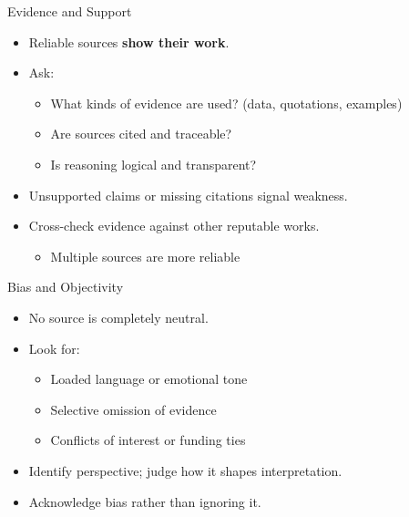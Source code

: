 \documentclass[aspectratio=169]{beamer}
\begin{document}
\begin{frame}{Evidence and Support}
\begin{itemize}
  \item Reliable sources \textbf{show their work}.
  \item Ask:
    \begin{itemize}
      \item What kinds of evidence are used? (data, quotations, examples)
      \item Are sources cited and traceable?
      \item Is reasoning logical and transparent?
    \end{itemize}
  \item Unsupported claims or missing citations signal weakness.
  \item Cross-check evidence against other reputable works.
    \begin{itemize}
    \item Multiple sources are more reliable
    \end{itemize}
\end{itemize}
\end{frame}

\begin{frame}{Bias and Objectivity}
\begin{itemize}
  \item No source is completely neutral.
  \item Look for:
    \begin{itemize}
      \item Loaded language or emotional tone
      \item Selective omission of evidence
      \item Conflicts of interest or funding ties
    \end{itemize}
  \item Identify perspective; judge how it shapes interpretation.
  \item Acknowledge bias rather than ignoring it.
\end{itemize}
\end{frame}
\end{document}

